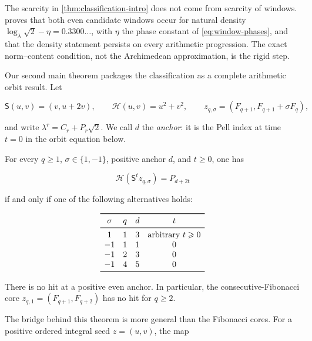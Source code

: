 The scarcity in \cref{thm:classification-intro} does not come from scarcity
of windows.  proves that both even candidate
windows occur for natural density
$\log_\lambda\sqrt2-\eta=0.3300\ldots$, with $\eta$ the phase constant of
\cref{eq:window-phases}, and that the density statement
persists on every arithmetic progression. The exact norm--content condition,
not the Archimedean approximation, is the rigid step.

Our second main theorem packages the classification as a complete arithmetic
orbit result. Let

\begin{equation}
 \mathsf S(u,v)=(v,u+2v),
 \qquad
 \mathcal H(u,v)=u^2+v^2,
 \qquad
 z_{q,\sigma}=(F_{q+1},F_{q+1}+\sigma F_q),
 \label{eq:intro-orbit-data}
\end{equation}

and write $\lambda^r=C_r+P_r\sqrt2$. We call $d$ the \emph{anchor}: it is
the Pell index at time $t=0$ in the orbit equation below.

\begin{theorem}
\label{thm:orbit-intro}
For every $q\geqslant1$, $\sigma\in\{1,-1\}$, positive anchor $d$, and
$t\geqslant0$, one has

\begin{equation}
 \mathcal H(\mathsf S^tz_{q,\sigma})=P_{d+2t}
 \label{eq:intro-orbit-hit}
\end{equation}

if and only if one of the following alternatives holds:

\begin{equation}
\begin{array}{cccc}
 \toprule
 \sigma&q&d&t\\
 \midrule
 1&1&3&\text{arbitrary }t\geqslant0\\
 -1&1&1&0\\
 -1&2&3&0\\
 -1&4&5&0\\
 \bottomrule
\end{array}
\label{eq:intro-orbit-list}
\end{equation}

There is no hit at a positive even anchor. In particular, the
consecutive-Fibonacci core $z_{q,1}=(F_{q+1},F_{q+2})$ has no hit for
$q\geqslant2$.
\end{theorem}

The bridge behind this theorem is more general than the Fibonacci cores.
For a positive ordered integral seed $z=(u,v)$, the map

